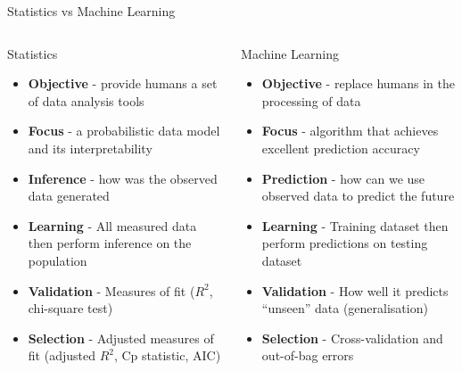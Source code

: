 \documentclass[pdf]{beamer}
\begin{document}
\begin{frame}{Statistics vs Machine Learning}
\footnotesize %
\begin{columns}
\begin{block}{Statistics}
	\begin{itemize}\addtolength{\itemsep}{0.6\baselineskip}
		\item<2-> \textbf{Objective} - provide humans a set of data analysis tools 
		\item<3-> \textbf{Focus} - a probabilistic data model and its interpretability
		\item<4-> \textbf{Inference} - how was the observed data generated
		\item<5-> \textbf{Learning} - All measured data then perform inference on the population
		\item<6-> \textbf{Validation} - Measures of fit ($R^2$, chi-square test)
		\item<7-> \textbf{Selection} - Adjusted measures of fit (adjusted $R^2$, Cp statistic, AIC)
	\end{itemize}
\end{block}
\begin{block}{Machine Learning}
	\begin{itemize}\addtolength{\itemsep}{0.6\baselineskip}
		\item<2-> \textbf{Objective} - replace humans in the processing of data  
		\item<3-> \textbf{Focus} - algorithm that achieves excellent prediction accuracy
		\item<4-> \textbf{Prediction} - how can we use observed data to predict the future
		\item<5-> \textbf{Learning} - Training dataset then perform predictions on testing dataset
		\item<6-> \textbf{Validation} - How well it predicts ``unseen'' data (generalisation)
		\item<7-> \textbf{Selection} - Cross-validation and out-of-bag errors
	\end{itemize}
\end{block}
\end{columns}
\end{frame}
\normalsize
\end{document}
